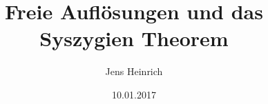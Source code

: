 \usepackage[left=3cm,right=3cm]{geometry}
\usepackage[T1]{fontenc}
\usepackage{lmodern}
\usepackage{standalone}






\usepackage[ngerman]{babel}
\renewcommand{\id}{\ensuremath{Id}}
\renewcommand{\familydefault}{\rmdefault}

\title{Freie Aufl\"osungen und das Syszygien Theorem}
\author{Jens Heinrich}
\date{10.01.2017}


